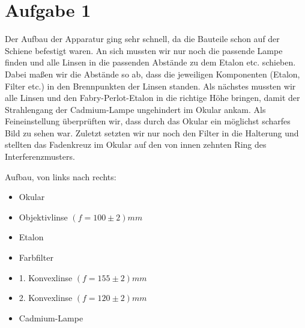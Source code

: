\section{Aufgabe 1}
Der Aufbau der Apparatur ging sehr schnell, da die Bauteile schon auf der Schiene befestigt waren. An sich mussten wir nur noch die passende Lampe finden und alle Linsen in die passenden Abstände zu dem Etalon etc. schieben. Dabei maßen wir die Abstände so ab, dass die jeweiligen Komponenten (Etalon, Filter etc.) in den Brennpunkten der Linsen standen.  Als nächstes mussten wir alle Linsen und den Fabry-Perlot-Etalon in die richtige Höhe bringen, damit der Strahlengang der Cadmium-Lampe ungehindert im Okular ankam. Als Feineinstellung überprüften wir, dass durch das Okular ein möglichst scharfes Bild zu sehen war. Zuletzt setzten wir nur noch den Filter in die Halterung  und stellten das Fadenkreuz im Okular auf den von innen zehnten Ring des Interferenzmusters.

\begin{center}
\begin{minipage}{\linewidth}
\centering
{}
\end{minipage}
\end{center}

Aufbau, von links nach rechts: 
\begin{itemize}
\item Okular
\item Objektivlinse $(f=100\pm 2)mm$
\item Etalon
\item Farbfilter
\item 1. Konvexlinse $(f=155\pm 2)mm$
\item 2. Konvexlinse $(f=120\pm 2)mm$
\item Cadmium-Lampe
\end{itemize}